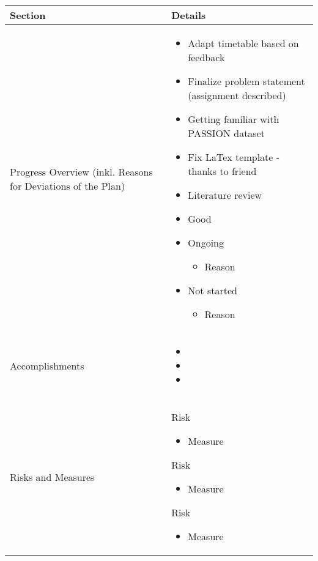 \documentclass[a4paper,11pt]{article}
\newcommand{\done}{\textcolor{green}{\ding{52}}}
\newcommand{\ongoing}{\textcolor{orange}{\ding{45}}}
\newcommand{\notstarted}{\textcolor{red}{\ding{56}}}
\begin{document}
	
	\renewcommand{\arraystretch}{1.5}
	\begin{longtable}{|p{4cm}|p{10cm}|}
		\hline
		\textbf{Section} & \textbf{Details} \\
		\hline
		Progress Overview (inkl. Reasons for Deviations of the Plan) & \begin{itemize}
			\item[\done] Adapt timetable based on feedback
			\item[\ongoing] Finalize problem statement (assignment described)
			\item[\ongoing] Getting familiar with PASSION dataset
			\item[\ongoing] Fix LaTex template - thanks to friend
			\item[\ongoing] Literature review
			
			\item[\done] Good
			\item[\ongoing] Ongoing
			\begin{itemize}
				\item Reason
			\end{itemize}
			\item[\notstarted] Not started
			\begin{itemize}
				\item Reason
			\end{itemize}
		\end{itemize} \\
		\hline
		Accomplishments & \begin{itemize}
			\item[\done] 
			\item[\done] 
			\item[\done] 
		\end{itemize} \\
		\hline
		Risks and Measures & 
		Risk
		\begin{itemize}
			\item Measure
		\end{itemize}
		
	    Risk
		\begin{itemize}
			\item Measure
		\end{itemize}
		
		Risk
		\begin{itemize}
			\item Measure
		\end{itemize} \\
		

\end{longtable}
\end{document}
